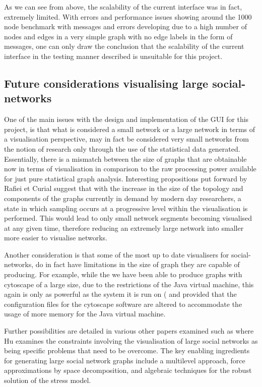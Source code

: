 As we can see from above, the scalability of the current interface was in fact,
extremely limited. With errors and performance issues showing around the 1000
node benchmark with messages and errors developing due to a high number of nodes
and edges in a very simple graph with no edge labels in the form of messages,
one can only draw the conclusion that the scalability of the current interface
in the testing manner described is unsuitable for this project.

\subsection{Future considerations visualising large social-networks}

One of the main issues with the design and implementation of the GUI for this project, is that what is considered a small network or a large network in terms of a visualisation perspective, may in fact be considered very small networks from the notion of research only through the use of the statistical data generated. Essentially, there is a mismatch between the size of graphs that are obtainable now in terms of visualisation in comparison to the raw processing power available for just pure statistical graph analysis. Interesting propositions put forward by Rafiei et Curial \cite{rafiei} suggest that with the increase in the size of the topology and components of the graphs currently in demand by modern day researchers, a state in which sampling occurs at a progressive level within the visualisation is performed. This would lead to only small network segments becoming visualised at any given time, therefore reducing an extremely large network into smaller more easier to visualise networks.

Another consideration is that some of the most up to date visualisers for social-networks, do in fact have limitations in the size of graph they are capable of producing. For example, while the we have been able to produce graphs with cytoscape of a large size, due to the restrictions of the Java virtual machine, this again is only as powerful as the system it is run on ( and provided that the configuration files for the cytoscape software are altered to accommodate the usage of more memory for the Java virtual machine.

Further possibilities are detailed in various other papers examined such as \cite{Hu10algorithmsfor} where Hu examines the constraints involving the visualisation of large social networks as being specific problems that need to be overcome. The key enabling ingredients for generating large social network graphs include a multilevel approach, force approximations by space decomposition, and algebraic techniques for the robust solution of the stress model.

